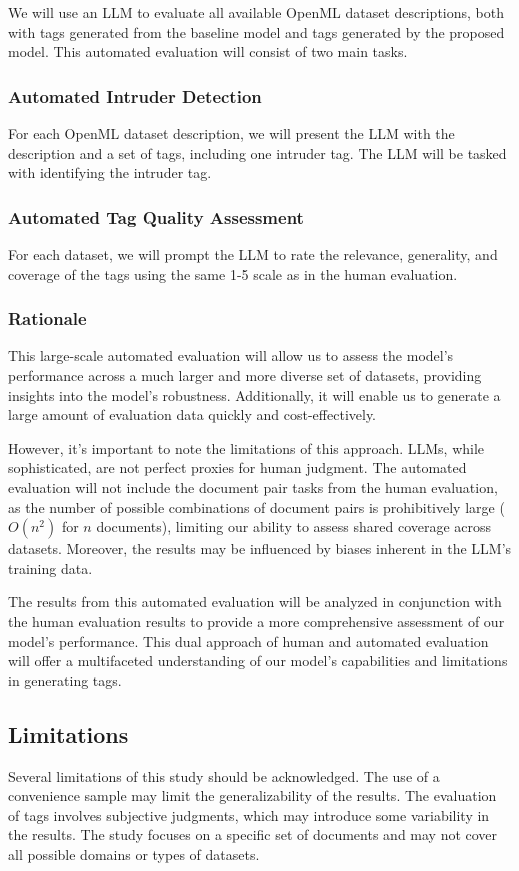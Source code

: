 We will use an LLM to evaluate all available OpenML dataset descriptions, both with tags generated from the baseline model and tags generated by the proposed model. This automated evaluation will consist of two main tasks.

\subsubsection{Automated Intruder Detection}
For each OpenML dataset description, we will present the LLM with the description and a set of tags, including one intruder tag. The LLM will be tasked with identifying the intruder tag.

\subsubsection{Automated Tag Quality Assessment}
For each dataset, we will prompt the LLM to rate the relevance, generality, and coverage of the tags using the same 1-5 scale as in the human evaluation.

\subsubsection{Rationale}
This large-scale automated evaluation will allow us to assess the model's performance across a much larger and more diverse set of datasets, providing insights into the model's robustness. Additionally, it will enable us to generate a large amount of evaluation data quickly and cost-effectively.

However, it's important to note the limitations of this approach. LLMs, while sophisticated, are not perfect proxies for human judgment. The automated evaluation will not include the document pair tasks from the human evaluation, as the number of possible combinations of document pairs is prohibitively large ($O(n^2)$ for $n$ documents), limiting our ability to assess shared coverage across datasets. Moreover, the results may be influenced by biases inherent in the LLM's training data.

The results from this automated evaluation will be analyzed in conjunction with the human evaluation results to provide a more comprehensive assessment of our model's performance. This dual approach of human and automated evaluation will offer a multifaceted understanding of our model's capabilities and limitations in generating tags.

\subsection{Limitations}
Several limitations of this study should be acknowledged. The use of a convenience sample may limit the generalizability of the results. The evaluation of tags involves subjective judgments, which may introduce some variability in the results. The study focuses on a specific set of documents and may not cover all possible domains or types of datasets.

